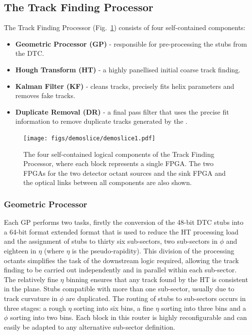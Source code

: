 \subsection{The Track Finding Processor}

The Track Finding Processor (Fig.~\ref{fig:TFP}) consists of four self-contained components:
\begin{itemize}
\item {\bf Geometric Processor (GP)} - responsible for pre-processing the stubs from the DTC.
\item {\bf Hough Transform (HT)} - a highly panellised initial coarse track finding.
\item {\bf Kalman Filter (KF)} - cleans tracks, precisely fits helix parameters and removes fake tracks.
\item {\bf Duplicate Removal (DR)} - a final pass filter that uses the precise fit information to remove duplicate tracks generated by the \HT.
\end{itemize}

\begin{figure}[!h]
\centering
\texttt{[image: figs/demoslice/demoslice1.pdf]}
\caption{The four self-contained logical components of the Track Finding Processor, where each block represents a single FPGA. The two FPGAs for the two detector octant sources and the sink FPGA and the optical links between all components are also shown.}
\label{fig:TFP}
\end{figure}

\subsubsection{Geometric Processor}\label{subsubsec:GP}
Each GP performs two tasks, firstly the conversion of the 48-bit DTC stubs into a 64-bit format extended format that is used to reduce the HT processing load and the assignment of stubs to thirty six sub-sectors, two sub-sectors in $\phi$ and eighteen in $\eta$ (where $\eta$ is the pseudo-rapidity). 
This division of the processing octants simplifies the task of the downstream logic required, allowing the track finding to be carried out independently and in parallel within each sub-sector. 
The relatively fine $\eta$ binning ensures that any track found by the \rphi HT is consistent in the \rz plane. Stubs compatible with more than one sub-sector, usually due to track curvature in $\phi$ are duplicated. 
The routing of stubs to sub-sectors occurs in three stages: a rough $\eta$ sorting into six bins, a fine $\eta$ sorting into three bins and a $\phi$ sorting into two bins. 
Each block in this router is highly reconfigurable and can easily be adapted to any alternative sub-sector definition.

